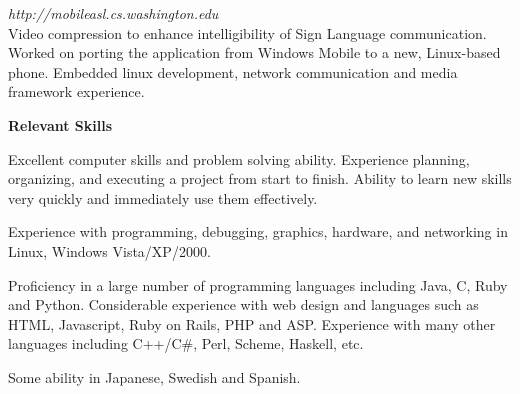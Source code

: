 \documentclass[9pt]{article}
\newcommand{\mysectiontitle}[1]{ { { \large{\textbf{#1} } } \vspace{0.02in}} }
\newenvironment{changemargin}[2]{%
  \begin{list}{}{%
    \setlength{\topsep}{0pt}%
    \setlength{\leftmargin}{#1}%
    \setlength{\rightmargin}{#2}%
    \setlength{\listparindent}{\parindent}%
    \setlength{\itemindent}{\parindent}%
    \setlength{\parsep}{\parskip}%
  }%
  \item[]}{\end{list}}
\begin{document}
\begin{changemargin}{1cm}{0.5cm}
\begin{changemargin}{0.5cm}{0.5cm}
      \textit{http://mobileasl.cs.washington.edu} \\
      Video compression to enhance intelligibility of Sign Language communication. Worked on porting the application from Windows Mobile 
      to a new, Linux-based phone.  Embedded linux development, network communication and media framework experience.
    \end{changemargin}
    
    
    \vspace{1em}
    \mysectiontitle{Relevant Skills}
    \begin{changemargin}{0.5cm}{0.5cm}
      Excellent computer skills and problem solving ability. Experience planning, organizing, and executing a project
      from start to finish.  Ability to learn new skills very quickly and immediately use them effectively.
  
      Experience with programming, debugging, graphics, hardware, and networking in Linux, Windows Vista/XP/2000.
  
      Proficiency in a large number of programming languages including Java, C, Ruby and Python.
      Considerable experience with web design and languages such as HTML, Javascript, Ruby on Rails, PHP and ASP. 
      Experience with many other languages including C++/C\#, Perl, Scheme, Haskell, etc.
  
      Some ability in Japanese, Swedish and Spanish.
    \end{changemargin}
  \end{changemargin}
\end{document}
